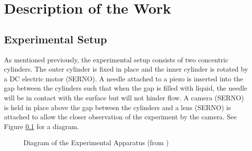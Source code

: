 \documentclass[a4]{report}
\def\achapter{preamble}
\begin{document}
	



	\chapter*{Description of the Work}
	\def\achapter{Description of the Work}



	\section{Experimental Setup}
	As mentioned previously, the experimental setup consists of two concentric cylinders. The outer cylinder is fixed in place and the inner cylinder is rotated by a DC electric motor (SERNO). A needle attached to a piezo is inserted into the gap between the cylinders such that when the gap is filled with liquid, the needle will be in contact with the surface but will not hinder flow. A camera (SERNO) is held in place above the gap between the cylinders and a lens (SERNO) is attached to allow the closer observation of the experiment by the camera. See Figure \ref{expdia} for a diagram.\newline
	\begin{figure}[!htb]
	\centering
	\caption{Diagram of the Experimental Apparatus (from )}
	\label{expdia}
	\end{figure} \newline  \noindent
\end{document}
